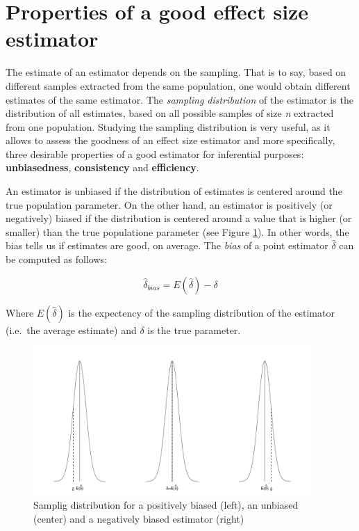 \documentclass[
  man]{apa6}
\begin{document}
\hypertarget{properties-of-a-good-effect-size-estimator}{%
\section{Properties of a good effect size estimator}\label{properties-of-a-good-effect-size-estimator}}

The estimate of an estimator depends on the sampling. That is to say, based on different samples extracted from the same population, one would obtain different estimates of the same estimator. The \emph{sampling distribution} of the estimator is the distribution of all estimates, based on all possible samples of size \emph{n} extracted from one population. Studying the sampling distribution is very useful, as it allows to assess the goodness of an effect size estimator and more specifically, three desirable properties of a good estimator for inferential purposes: \textbf{unbiasedness}, \textbf{consistency} and \textbf{efficiency}.

An estimator is unbiased if the distribution of estimates is centered around the true population parameter. On the other hand, an estimator is positively (or negatively) biased if the distribution is centered around a value that is higher (or smaller) than the true populatione parameter (see Figure \ref{fig:BIAS}). In other words, the bias tells us if estimates are good, on average. The \emph{bias} of a point estimator \(\hat{\delta}\) can be computed as follows:

\begin{equation} 
\hat{\delta}_{bias}=E(\hat{\delta})-\delta
\label{eq:BIAS}
\end{equation}

Where \(E(\hat{\delta})\) is the expectency of the sampling distribution of the estimator (i.e.~the average estimate) and \(\delta\) is the true parameter.

\begin{figure}
\includegraphics[width=400px]{ES_files/figure-latex/BIAS-1} \caption{Samplig distribution for a positively biased (left), an unbiased (center) and a negatively biased estimator (right)}\label{fig:BIAS}
\end{figure}
\end{document}
